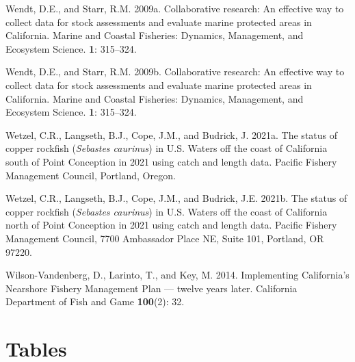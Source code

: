 \documentclass[11pt,
  english,
  letterpaper,
]{article}
\newlength{\cslhangindent}
\newenvironment{CSLReferences}[2] %
 {%
  \setlength{\parindent}{0pt}
  \ifodd #1 \everypar{\setlength{\hangindent}{\cslhangindent}}\ignorespaces\fi
  \ifnum #2 > 0
  \setlength{\parskip}{#2\baselineskip}
  \fi
 }%
 {}
\begin{document}
\begin{CSLReferences}{1}{0}
\leavevmode{}%
Wendt, D.E., and Starr, R.M. 2009a. Collaborative research: An effective way to collect data for stock assessments and evaluate marine protected areas in {C}alifornia. Marine and Coastal Fisheries: Dynamics, Management, and Ecosystem Science. \textbf{1}: 315--324.

\leavevmode{}%
Wendt, D.E., and Starr, R.M. 2009b. Collaborative research: An effective way to collect data for stock assessments and evaluate marine protected areas in {California}. Marine and Coastal Fisheries: Dynamics, Management, and Ecosystem Science. \textbf{1}: 315--324.

\leavevmode{}%
Wetzel, C.R., Langseth, B.J., Cope, J.M., and Budrick, J. 2021a. The status of copper rockfish (\emph{{Sebastes} caurinus}) in {U}.{S}. Waters off the coast of {California} south of {Point} {Conception} in 2021 using catch and length data. Pacific Fishery Management Council, Portland, Oregon.

\leavevmode{}%
Wetzel, C.R., Langseth, B.J., Cope, J.M., and Budrick, J.E. 2021b. The status of copper rockfish (\emph{{Sebastes} caurinus}) in {U}.{S}. Waters off the coast of {California} north of {Point} {Conception} in 2021 using catch and length data. Pacific Fishery Management Council, 7700 Ambassador Place NE, Suite 101, Portland, OR 97220.

\leavevmode{}%
Wilson-Vandenberg, D., Larinto, T., and Key, M. 2014. Implementing {California}'s {Nearshore} {Fishery} {Management} {Plan} --- twelve years later. California Department of Fish and Game \textbf{100}(2): 32.

\end{CSLReferences}

\clearpage

\hypertarget{tables}{%
\section{Tables}\label{tables}}

\begingroup\fontsize{10}{12}\selectfont
\begingroup\fontsize{10}{12}\selectfont
\end{document}
